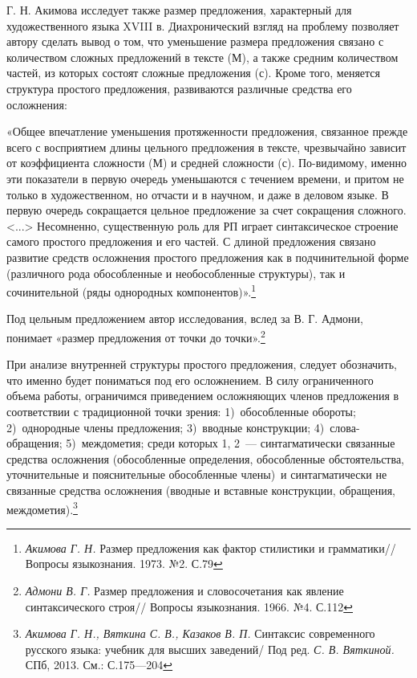 \documentclass{kursa4}
\begin{document}
{      Г. Н. Акимова исследует также размер предложения, характерный для
      художественного языка XVIII в. Диахронический взгляд на проблему
      позволяет автору сделать вывод о том, что уменьшение размера
      предложения связано с количеством сложных предложений в тексте (М), а
      также средним количеством частей, из которых состоят сложные
      предложения (с). Кроме того, меняется структура простого предложения,
      развиваются различные средства его осложнения:

      «Общее впечатление уменьшения протяженности предложения, связанное
      прежде всего с восприятием длины цельного предложения в тексте,
      чрезвычайно зависит от коэффициента сложности (М) и средней сложности
      (с). По-видимому, именно эти показатели в первую очередь уменьшаются с
      течением времени, и притом не только в художественном, но отчасти и в
      научном, и даже в деловом языке. В первую очередь сокращается цельное
      предложение за счет сокращения сложного. \textless{}...\textgreater{}
      Несомненно, существенную роль для РП играет синтаксическое строение
      самого простого предложения и его частей. С длиной предложения связано
      развитие средств осложнения простого предложения как в подчинительной
      форме (различного рода обособленные и необособленные структуры), так и
      сочинительной (ряды однородных
      компонентов)».\footnote{\textit{{ Акимова Г. Н.
      }}{Размер предложения как фактор стилистики и
      грамматики// Вопросы языкознания. 1973. №2. С.79}} 

      Под цельным предложением автор исследования, вслед за В. Г. Адмони,
      понимает «размер предложения от точки до
      точки».\footnote{\textit{{ Адмони В.
      Г.}}{ Размер предложения и словосочетания как явление
      синтаксического строя// Вопросы языкознания. 1966. №4. С.112}}

      При анализе внутренней структуры простого предложения, следует
      обозначить, что именно будет пониматься под его осложнением. В силу
      ограниченного объема работы, ограничимся приведением осложняющих членов
      предложения в соответствии с традиционной точки зрения: 1)~обособленные
      обороты; 2)~однородные члены предложения; 3)~вводные конструкции;
      4)~слова-обращения; 5)~междометия; среди которых 1, 2~--- синтагматически
      связанные средства осложнения (обособленные определения, обособленные
      обстоятельства, уточнительные и пояснительные обособленные члены)~и
      синтагматически не связанные средства осложнения (вводные и вставные
      конструкции, обращения, междометия).\footnote{\textit{Акимова Г. Н.,
      Вяткина С. В., Казаков В. П. }Синтаксис современного русского языка: учебник для высших заведений/ Под ред. {\textit{С. В. Вяткиной.} СПб, 2013. См.: С.175—204} 

}}
\end{document}

